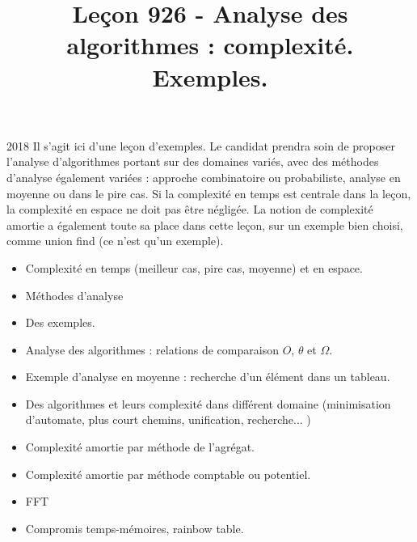 \documentclass{agregfiche}
\title{Leçon 926 - Analyse des algorithmes : complexité. Exemples.}
\begin{document}
\maketitle

\secrapports
\begin{rapport}{2018}
    Il s’agit ici d’une leçon d’exemples. Le candidat prendra soin de proposer l’analyse d’algorithmes portant
    sur des domaines variés, avec des méthodes d’analyse également variées : approche combinatoire ou
    probabiliste, analyse en moyenne ou dans le pire cas.
    Si la complexité en temps est centrale dans la leçon, la complexité en espace ne doit pas être négligée.
    La notion de complexité amortie a également toute sa place dans cette leçon, sur un exemple bien
    choisi, comme union find (ce n’est qu’un exemple).
\end{rapport}

\secindispensables

\begin{itemize}
        \item Complexité en temps (meilleur cas, pire cas, moyenne)
        et en espace.
	\item Méthodes d'analyse
    \item Des exemples.
\end{itemize}

\secasavoir

\begin{itemize}
	\item Analyse des algorithmes : relations de comparaison $O$, $\theta$ et $\Omega$.
    \item Exemple d’analyse en moyenne : recherche d’un élément dans un tableau.
    \item Des algorithmes et leurs complexité dans différent domaine (minimisation d'automate, plus court chemins, unification, recherche... )
    	\item Complexité amortie par méthode de l'agrégat.

\end{itemize}

\secidees

\begin{itemize}
    	\item Complexité amortie par méthode comptable ou potentiel.
        \item FFT
        \item Compromis temps-mémoires, rainbow table.
\end{itemize}
\end{document}
